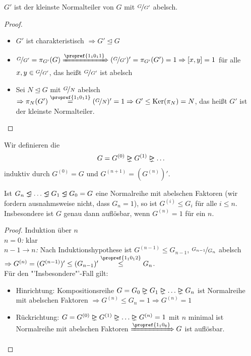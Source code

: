 \begin{lemma}
	$G'$ ist der kleinste Normalteiler von $G$ mit $\nicefrac{G}{G'}$ abelsch.
\end{lemma}
\begin{proof}
	\begin{itemize}
		\item $G'$ ist charakteristisch $\Rightarrow G' \unlhd G$
		\item $\lnkset{G}{G'} = \pi_{G'} (G) \xRightarrow{\propref{1_10_11}} (\lnkset{G}{G'})' = \pi_{G'}(G') = 1 \Rightarrow [x,y] = 1$ für alle $x,y \in \nicefrac{G}{G'}$, das heißt $\nicefrac{G}{G'}$ ist abelsch
		\item Sei $N \unlhd G$ mit $\nicefrac{G}{N}$ abelsch $\Rightarrow \pi_{N}(G') \overset{\propref{1_10_11}}{=} (\lnkset{G}{N})' = 1 \Rightarrow G' \leq \Ker(\pi_{N}) = N$, das heißt $G'$ ist der kleinste Normalteiler.
	\end{itemize}
\end{proof}

\begin{definition}[Kommutatorreihe]
	Wir definieren die 
	\begin{align}
	G = G^{(0)} \properidealright G^{(1)} \properidealright \dots\notag
	\end{align}
	induktiv durch $G^{(0)} = G$ und $G^{(n+1)} = (G^{(n)})'$.
\end{definition}

\begin{proposition}
	Ist $G_n \properideal \dots \properideal G_1 \properideal G_0 = G$ eine Normalreihe mit abelschen Faktoren (wir fordern ausnahmsweise nicht, dass $G_n = 1$), so ist $G^{(i)} \le G_i$ für alle $i \leq n$. Insbesondere ist $G$ genau dann auflösbar, wenn $G^{(n)} = 1$ für ein $n$.
\end{proposition}

\begin{proof}
	Induktion über $n$ \\
	\emph{$n = 0$:} klar \\
	\emph{$n-1 \to n$:} Nach Induktionshypothese ist $G^{(n-1)} \leq G_{n-1}$, $\nicefrac{G_{n-1}}{G_n}$ abelsch $\Rightarrow G^{(n)} = (G^{(n-1)})' \leq (G_{n-1})' \overset{\propref{1_10_12}}{\leq} G_n$.\\
	Für den "'Insbesondere"'-Fall gilt:
	\begin{itemize}
		\item Hinrichtung: Kompositionsreihe $G = G_0 \properidealright G_1 \properidealright \dots \properidealright G_n$ ist Normalreihe mit abelschen Faktoren $\Rightarrow G^{(n)} \leq G_n = 1 \Rightarrow G^{(n)} = 1$
		\item Rückrichtung: $G = G^{(0)} \properidealright G^{(1)} \properidealright \dots \properidealright G^{(n)} = 1$ mit $n$ minimal ist Normalreihe mit abelschen Faktoren $\xRightarrow{\propref{1_10_8}} G$ ist auflösbar.
	\end{itemize}
\end{proof}

